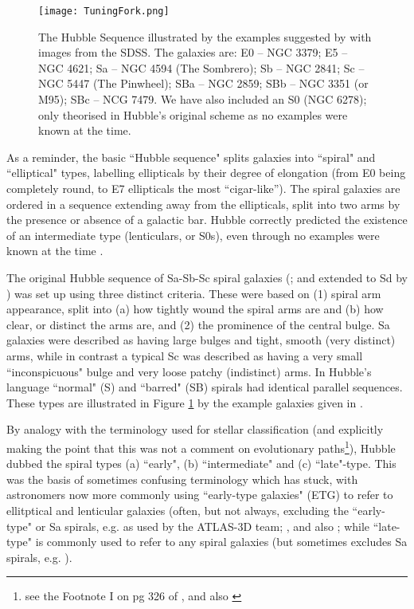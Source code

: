 \documentclass[usenatbib]{mn2e}
\begin{document}
\begin{figure}
\texttt{[image: TuningFork.png]}
\caption{The Hubble Sequence illustrated by the examples suggested by \citet{Hubble1926} with images from the SDSS. The galaxies are: E0 -- NGC 3379; E5 -- NGC 4621;  Sa -- NGC 4594 (The Sombrero);  Sb -- NGC 2841; Sc -- NGC 5447 (The Pinwheel); SBa -- NGC 2859; SBb -- NGC 3351 (or M95); SBc -- NCG 7479. We have also included an S0 (NGC 6278); only theorised in Hubble's original scheme as no examples were known at the time. \label{sequence}}
\end{figure}

As a reminder, the basic ``Hubble sequence" splits galaxies into ``spiral" and ``elliptical" types, labelling ellipticals by their degree of elongation (from E0 being completely round, to E7 ellipticals the most ``cigar-like''). The spiral galaxies are ordered in a sequence extending away from the ellipticals, split into two arms by the presence or absence of a galactic bar. 
Hubble correctly predicted the existence of an intermediate type (lenticulars, or S0s), even through no examples were known at the time \citep{Buta2013}. 

The original Hubble sequence of Sa-Sb-Sc spiral galaxies (\citealt{Hubble1926}; and extended to Sd by \citealt{1959HDP....53..275D}) was set up using three distinct criteria. These were based on (1) spiral arm appearance, split into (a) how tightly wound the spiral arms are and (b) how clear, or distinct the arms are, and (2) the prominence of the central bulge. Sa galaxies were described as having large bulges and tight, smooth (very distinct) arms, while in contrast a typical Sc was described as having a very small ``inconspicuous" bulge and very loose patchy (indistinct) arms. In Hubble's language ``normal" (S) and ``barred" (SB) spirals had identical parallel sequences. These types are illustrated in Figure \ref{sequence} by the example galaxies given in \citet{Hubble1926}. 

By analogy with the terminology used for stellar classification (and explicitly making the point that this was not a comment on evolutionary paths\footnote{see the Footnote I on pg 326 of \citet{Hubble1926}, and also \citet{Baldry2008AG}}), Hubble dubbed the spiral types (a) ``early",  (b) ``intermediate" and (c) ``late"-type. This was the basis of sometimes confusing terminology which has stuck, with astronomers now more commonly using ``early-type galaxies"  (ETG) to refer to ellitptical and lenticular galaxies (often, but not always, excluding the ``early-type" or Sa spirals, e.g. as used by the ATLAS-3D team; \citealt{2011MNRAS.413..813C,2011MNRAS.416.1680C}, and also \citet{Stanford1998}; while ``late-type" is commonly used to refer to any spiral galaxies (but sometimes excludes Sa spirals, e.g. \citealt{Strateva2001}).
\end{document}

